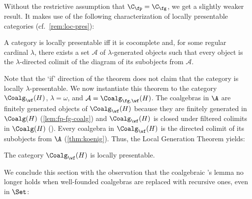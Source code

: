 \documentclass[a4paper,UKenglish, autoref, numberwithinsect, final]{lipics-v2021}
\numberwithin{equation}{section}
\newcommand{\injmono}{\ensuremath{\overset{\smash{\raisebox{-1pt}{\ensuremath{\scriptstyle+}}}}{\rightarrowtail}}}%
\newcommand{\hpresint}{\ensuremath{H\cap}\xspace}
\theoremstyle{plain}
\theoremstyle{definition}
\begin{document}
Without the restrictive assumption that $\C_\fp=\C_\fg$, we get a slightly weaker result. It makes use of the following characterization of locally presentable categories (cf.\ \autoref{rem:loc-pres}):

\begin{theorem} A category is locally presentable iff it is cocomplete and, for some regular cardinal $\lambda$, there exists a set $\mathcal{A}$ of $\lambda$-generated objects such that every object is the $\lambda$-directed colimit of the diagram of its subobjects from $\mathcal{A}$. 
\end{theorem}

Note that the `if' direction of the theorem does not claim that the category is locally $\lambda$-presentable. We now instantiate this theorem to the category $\Coalg_\wf(H)$, $\lambda=\omega$, and $\mathcal{A}=\Coalg_{\fg,\wf}(H)$. The coalgebras in $\A$ are finitely generated objects of $\Coalg_\wf(H)$ because they are finitely generated in $\Coalg(H)$ (\autoref{lem:fp-fg-coalg}) and  $\Coalg_\wf(H)$ is closed under filtered colimits in $\Coalg(H)$ (). Every coalgebra in $\Coalg_\wf(H)$ is the directed colimit of its subobjects from $\A$ (\autoref{thm:koenig}). Thus, the Local Generation Theorem yields:

\begin{corollary}[\smash{\injmono}, \hpresint]
The category $\Coalg_\wf(H)$ is locally presentable.
\end{corollary}
We conclude this section with the observation that the coalgebraic \Konig's lemma no longer holds when well-founded coalgebras are replaced with recursive ones, even in $\Set$:
\end{document}
